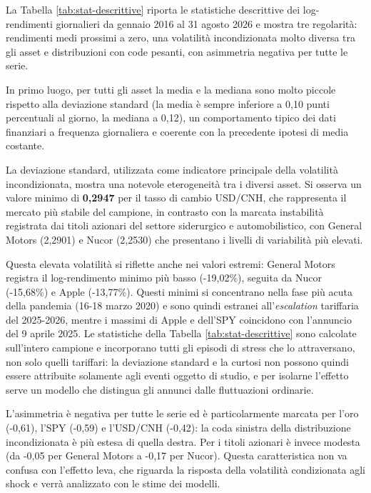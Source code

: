 La Tabella \ref{tab:stat-descrittive} riporta le statistiche descrittive dei log-rendimenti giornalieri da gennaio 2016 al 31 agosto 2026 e mostra tre regolarità: 
rendimenti medi prossimi a zero, una volatilità incondizionata molto diversa tra gli asset e distribuzioni con code pesanti, con asimmetria negativa per tutte le serie.

In primo luogo, per tutti gli asset la media e la mediana sono molto piccole rispetto alla deviazione standard (la media è sempre inferiore a 0,10 punti percentuali al 
giorno, la mediana a 0,12), un comportamento tipico dei dati finanziari a frequenza giornaliera e coerente con la precedente ipotesi di media costante.

La deviazione standard, utilizzata come indicatore principale della volatilità incondizionata, mostra una notevole eterogeneità tra i diversi asset. Si osserva un valore 
minimo di \textbf{0,2947} per il tasso di cambio USD/CNH, che rappresenta il mercato più stabile del campione, in contrasto con la marcata instabilità registrata 
dai titoli azionari del settore siderurgico e automobilistico, con General Motors (2,2901) e Nucor (2,2530) che presentano i livelli di variabilità più elevati.

Questa elevata volatilità si riflette anche nei valori estremi: General Motors registra il log-rendimento minimo più basso (-19,02\%), seguita da Nucor (-15,68\%) e 
Apple (-13,77\%). Questi minimi si concentrano nella fase più acuta della pandemia (16-18 marzo 2020) e sono quindi estranei all'\emph{escalation} tariffaria del 2025-2026, 
mentre i massimi di Apple e dell'SPY coincidono con l'annuncio del 9 aprile 2025. Le statistiche della Tabella \ref{tab:stat-descrittive} sono calcolate sull'intero 
campione e incorporano tutti gli episodi di stress che lo attraversano, non solo quelli tariffari: la deviazione standard e la curtosi non possono quindi essere attribuite 
solamente agli eventi oggetto di studio, e per isolarne l'effetto serve un modello che distingua gli annunci dalle fluttuazioni ordinarie.

L'asimmetria è negativa per tutte le serie ed è particolarmente marcata per l'oro (-0,61), l'SPY (-0,59) e l'USD/CNH (-0,42): la coda sinistra della distribuzione 
incondizionata è più estesa di quella destra. Per i titoli azionari è invece modesta (da -0,05 per General Motors a -0,17 per Nucor). Questa caratteristica non va confusa 
con l'effetto leva, che riguarda la risposta della volatilità condizionata agli shock e verrà analizzato con le stime dei modelli.

